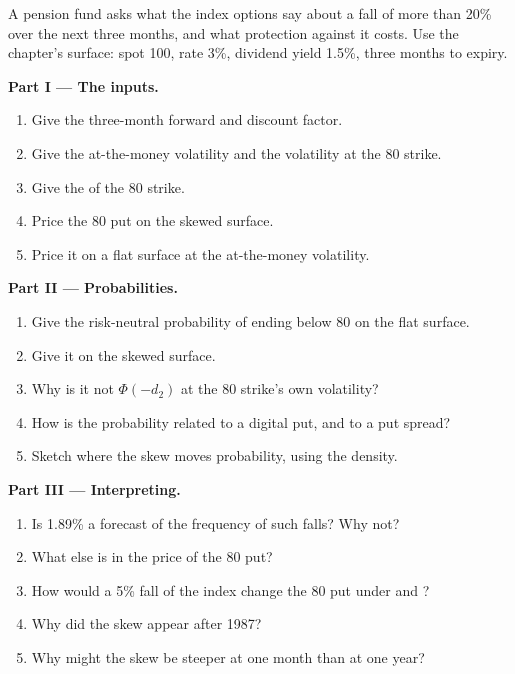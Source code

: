 \begin{problem}\label{pb:dv:implied-volatility-and-its-surface:1}
A pension fund asks what the index options say about a fall of more than 20\% over the next
three months, and what protection against it costs. Use the chapter's surface: spot 100,
rate 3\%, dividend yield 1.5\%, three months to expiry.

\medskip\noindent\textbf{Part I --- The inputs.}
\begin{enumerate}
\item Give the three-month forward and discount factor.
\item Give the at-the-money volatility and the volatility at the 80 strike.
\item Give the  of the 80 strike.
\item Price the 80 put on the skewed surface.
\item Price it on a flat surface at the at-the-money volatility.
\end{enumerate}

\medskip\noindent\textbf{Part II --- Probabilities.}
\begin{enumerate}[resume]
\item Give the risk-neutral probability of ending below 80 on the flat surface.
\item Give it on the skewed surface.
\item Why is it not $\Phi(-d_2)$ at the 80 strike's own volatility?
\item How is the probability related to a digital put, and to a put spread?
\item Sketch where the skew moves probability, using the density.
\end{enumerate}

\medskip\noindent\textbf{Part III --- Interpreting.}
\begin{enumerate}[resume]
\item Is 1.89\% a forecast of the frequency of such falls? Why not?
\item What else is in the price of the 80 put?
\item How would a 5\% fall of the index change the 80 put under  and ?
\item Why did the skew appear after 1987?
\item Why might the skew be steeper at one month than at one year?
\end{enumerate}


\end{problem}
